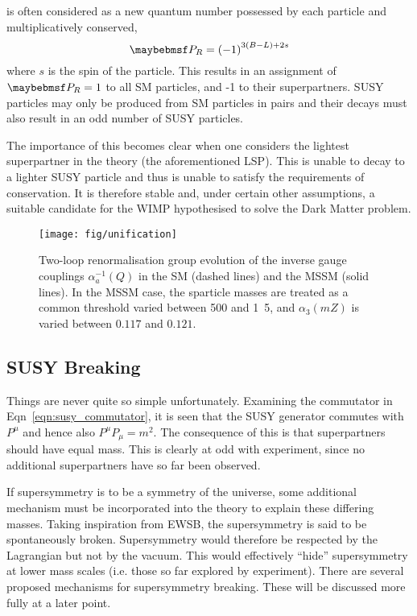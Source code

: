 \Rparity is often considered as a new quantum number possessed by each particle
and multiplicatively conserved,
\begin{equation}
\PR = \left(-1\right)^{3(B-L)+2s}
\end{equation}
where $s$ is the spin of the particle. This results in an assignment of $\PR =
1$ to all \ac{SM} particles, and -1 to their superpartners. \ac{SUSY} particles
may only be produced from \ac{SM} particles in pairs and their decays must also
result in an odd number of \ac{SUSY} particles.

The importance of this becomes clear when one considers the lightest
superpartner in the theory (the aforementioned \ac{LSP}). This is unable to
decay to a lighter \ac{SUSY} particle and thus is unable to satisfy the
requirements of \Rparity conservation. It is therefore stable and, under certain
other assumptions, a suitable candidate for the \ac{WIMP} hypothesised to solve
the Dark Matter problem.

\begin{figure}
\centering
\texttt{[image: fig/unification]}
\caption{Two-loop renormalisation group evolution of the inverse gauge couplings
  $\alpha_a^{−1}(Q)$ in the \ac{SM} (dashed lines) and the MSSM (solid
  lines). In the MSSM case, the sparticle masses are treated as a common
  threshold varied between \unit{500}{\GeV} and \unit{1.5}{\TeV}, and
  $\alpha_3(mZ)$ is varied between $0.117$ and $0.121$.~\cite{susy_primer}}
\label{fig:susy_gauge_unification}
\end{figure}

\subsection{\ac{SUSY} Breaking}
Things are never quite so simple unfortunately. Examining the commutator in
Eqn~\ref{eqn:susy_commutator}, it is seen that the \ac{SUSY} generator \Qa
commutes with $P^{\mu}$ and hence also $P^{\mu}P_{\mu} = m^2$. The consequence
of this is that superpartners should have equal mass. This is clearly at odd
with experiment, since no additional superpartners have so far been
observed.

If supersymmetry is to be a symmetry of the universe, some additional mechanism
must be incorporated into the theory to explain these differing masses. Taking
inspiration from \ac{EWSB}, the supersymmetry is said to be spontaneously
broken. Supersymmetry would therefore be respected by the Lagrangian but not by
the vacuum. This would effectively ``hide'' supersymmetry at lower mass scales
(i.e. those so far explored by experiment). There are several proposed
mechanisms for supersymmetry breaking. These will be discussed more fully at a
later point.

